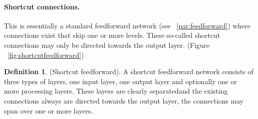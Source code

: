 \documentclass[pdftex,a4paper,12pt,twoside]{report}
\theoremstyle{plain} \newtheorem{theorem}{Theorem} \newtheorem{proposition}{Proposition} \newtheorem{lemma}{Lemma} \newtheorem*{corollary}{Corollary}
\theoremstyle{definition} \newtheorem{definition}{Definition} \newtheorem{conjecture}{Conjecture} \newtheorem*{example}{Example} \newtheorem{algorithm}{Algorithm}
\theoremstyle{remark} \newtheorem*{remark}{Remark} \newtheorem*{note}{Note} \newtheorem{case}{Case}
\begin{document}
\paragraph{Shortcut connections.}
This is essentially a standard feedforward network (see ~\ref{par:feedforward}) where connections exist that skip one or more levels. These so-called shortcut connections may only be directed towards the output layer. (Figure ~\ref{fig:shortcutfeedforward})
\begin{definition}
(Shortcut feedforward). A shortcut feedforward network consists of three types of layers, one input layer, one output layer and optionally one or more processing layers. These layers are clearly separatedand the existing connections always are directed towards the output layer, the connections may span over one or more layers.
\end{definition}
\end{document}
